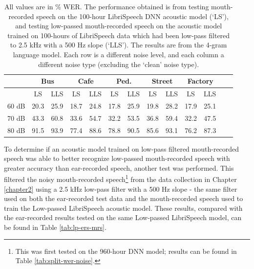 \begin{table}[h]
\begin{center}
\begin{tabular}{| c || c | c | c | c | c | c | c | c | c | c | c | c |} \hline
      & \multicolumn{2}{|c|}{Bus} & \multicolumn{2}{|c|}{Cafe} & \multicolumn{2}{|c|}{Ped.} & \multicolumn{2}{|c|}{Street} & \multicolumn{2}{|c|}{Factory} \\ \hline
      & LS & LLS & LS & LLS & LS & LLS & LS & LLS & LS & LLS \\ \hline\hline
60 dB & 20.3 & 25.9 & 18.7 & 24.8 & 17.8 & 25.9 & 19.8 & 28.2 & 17.9 & 25.1  \\ \hline
70 dB & 43.3 & 60.8 & 33.6 & 54.7 & 32.2 & 53.5 & 36.8 & 59.4 & 32.2 & 47.5  \\ \hline
80 dB & 91.5 & 93.9 & 77.4 & 88.6 & 78.8 & 90.5 & 85.6 & 93.1 & 76.2 & 87.3  \\ \hline
\end{tabular}
\end{center}
\caption{All values are in \% WER. The performance obtained is from testing mouth-recorded speech on the 100-hour LibriSpeech DNN acoustic model (`LS'), and testing low-passed mouth-recorded speech on the acoustic model trained on 100-hours of LibriSpeech data which had been low-pass filtered to 2.5 kHz with a 500 Hz slope (`LLS').  The results are from the 4-gram language model.  Each row is a different noise level, and each column a different noise type (excluding the `clean' noise type).}\label{tab:lp-mrs-fb-mrs}
\end{table}

To determine if an acoustic model trained on low-pass filtered mouth-recorded speech was able to better recognize low-passed mouth-recorded speech with greater accuracy than ear-recorded speech, another test was performed.  This filtered the noisy mouth-recorded speech\footnote{This was first tested on the 960-hour DNN model; results can be found in Table \ref{tab:split-wer-noise}.} from the data collection in Chapter \ref{chapter2} using a 2.5 kHz low-pass filter with a 500 Hz slope - the same filter used on both the ear-recorded test data and the mouth-recorded speech used to train the Low-passed LibriSpeech acoustic model.  These results, compared with the ear-recorded results tested on the same Low-passed LibriSpeech model, can be found in Table \ref{tab:lp-ers-mrs}.

